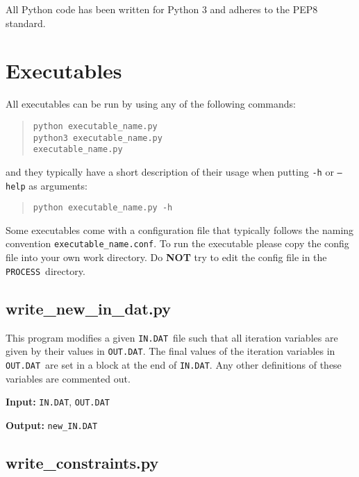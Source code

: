 \documentclass[11pt,a4paper]{report}
\newcommand{\indat}{\mbox{\texttt{IN.DAT}}}
\newcommand{\outdat}{\mbox{\texttt{OUT.DAT}}}
\newcommand{\process}{\mbox{\texttt{PROCESS}}}
\begin{document}
All Python code has been written for Python 3 and adheres to the PEP8 standard.

\section{Executables}
\label{sec:py_exec}

All executables can be run by using any of the following commands:
\begin{quote}
\begin{verbatim}
python executable_name.py
python3 executable_name.py
executable_name.py
\end{verbatim}
\end{quote}
and they typically have a short description of their usage when putting
\texttt{-h} or \texttt{--help} as arguments:
\begin{quote}
\begin{verbatim}
python executable_name.py -h
\end{verbatim}
\end{quote}

Some executables come with a configuration file that typically follows the
naming convention \texttt{executable\_name.conf}. To run the executable please
copy the config file into your own work directory. Do \textbf{NOT} try to edit
the config file in the \process\ directory.

\subsection{write\_new\_in\_dat.py}

This program modifies a given \indat\ file such that all iteration variables
are given by their values in \outdat. The final values of the iteration
variables in \outdat\ are set in a block at the end of \indat. Any other
definitions of these variables are commented out.

\begin{description}
\item{\textbf{Input:}}
\indat, \outdat\ 
                                
\item{\textbf{Output:}}
\texttt{new\_IN.DAT}
\end{description}

\subsection{write\_constraints.py}
\end{document}
